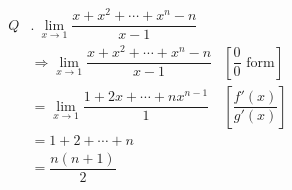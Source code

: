 \large
\ttfamily
\vtitle[Evaluate]

\addtolength{\jot}{3ex}
\begin{align*}
Q &.~\lim_{x\to 1}\dfrac{x + x^2 + \cdots + x^n-n}{x-1}\\
	&\Rightarrow \lim_{x\to 1}\dfrac{x + x^2 + \cdots + x^n-n}{x-1} &\left[\dfrac{0}{0} \text{ form}\right]\\
	&= \lim_{x\to 1}\dfrac{1 + 2x + \cdots + nx^{n-1}}{1} &\left[\dfrac{f'(x)}{g'(x)}\right]\\
	&=1+2+\cdots+n\\
	&= \dfrac{n(n+1)}{2}
\end{align*}

